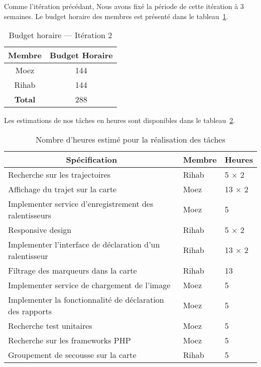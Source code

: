 Comme l'itération précédant, Nous avons fixé la période de cette itération à 3
semaines. Le budget horaire des membres est présenté dans le
tableau~\ref{tab:sprint2-capacity}.

\begin{table}[H]
    \centering
    \begin{tabular}{| c | c |}
        \hline
        \textbf{Membre} & \textbf{Budget Horaire} \\ \hline
        \hline
Moez & 144 \\ \hline
Rihab & 144 \\ \hline
\textbf{Total} & 288 \\ \hline
    \end{tabular}
    \caption{Budget horaire --- Itération 2}
\label{tab:sprint2-capacity}
\end{table}

Les estimations de nos tâches en heures sont disponibles dans le
tableau~\ref{tab:sprint2-estimation}.

\begin{table}[H]
    \centering
    \begin{tabular}{| l | l | l |}

        \hline
        \multicolumn{1}{|c}{\textbf{Spécification}} &
        \multicolumn{1}{|c}{\textbf{Membre}} &
        \multicolumn{1}{|c|}{\textbf{Heures}} \\ \hline

        \hline
Recherche sur les trajectoires & Rihab & 5 $\times$ 2 \\ \hline
Affichage du trajet sur la carte & Moez & 13 $\times$ 2 \\ \hline
Implementer service d'enregistrement des ralentisseurs & Moez & 5 \\ \hline
Responsive design & Rihab & 5 $\times$ 2 \\ \hline
Implementer l'interface de déclaration d'un ralentisseur & Rihab & 13 $\times$ 2 \\ \hline
Filtrage des marqueurs dans la carte & Rihab & 13 \\ \hline
Implementer service de chargement de l'image & Moez & 5 \\ \hline
Implementer la fonctionnalité de déclaration des rapports & Moez & 5 \\ \hline
Recherche test unitaires & Moez & 5 \\ \hline
Recherche sur les frameworks PHP & Moez & 5 \\ \hline
Groupement de secousse sur la carte & Rihab & 5 \\ \hline
    \end{tabular}
    \caption{Nombre d'heures estimé pour la réalisation des tâches}
\label{tab:sprint2-estimation}
\end{table}

